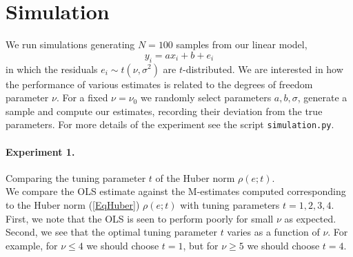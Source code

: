 \documentclass[11pt, a4 paper]{article}
\begin{document}

\section{Simulation} \label{SecSim}
We run simulations generating $N=100$ samples from our linear model,
\[
y_i = ax_i + b + e_i
\]
in which the residuals $e_i \sim t(\nu, \sigma^2)$ are $t$-distributed. We are interested in how the performance of various estimates is related to the degrees of freedom parameter $\nu$. For a fixed $\nu = \nu_0$ we randomly select parameters $a, b, \sigma$, generate a sample and compute our estimates, recording their deviation from the true parameters. For more details of the experiment see the script  \texttt{simulation.py}.

\paragraph{Experiment 1.} Comparing the tuning parameter $t$ of the Huber norm $\rho(e; t)$.\\

We compare the OLS estimate against the M-estimates computed corresponding to the Huber norm (\ref{EqHuber}) $\rho(e;t)$ with tuning parameters $t = 1, 2, 3, 4$.\\

First, we note that the OLS is seen to perform poorly for small $\nu$ as expected. Second, we see that the optimal tuning parameter $t$ varies as a function of $\nu$. For example, for $\nu \leq 4$ we should choose $t=1$, but for $\nu \geq 5$ we should choose $t=4$.

\end{document}
